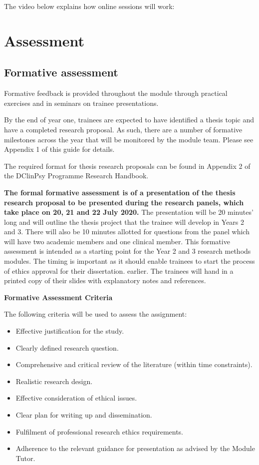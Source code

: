 \documentclass[
]{book}
\providecommand{\tightlist}{%
  \setlength{\itemsep}{0pt}\setlength{\parskip}{0pt}}
\begin{document}
The video below explains how online sessions will work:

\hypertarget{assessment}{%
\chapter{Assessment}\label{assessment}}

\hypertarget{formative-assessment}{%
\section{Formative assessment}\label{formative-assessment}}

Formative feedback is provided throughout the module through practical exercises and in seminars on trainee presentations.

By the end of year one, trainees are expected to have identified a thesis topic and have a completed research proposal. As such, there are a number of formative milestones across the year that will be monitored by the module team. Please see Appendix 1 of this guide for details.

The required format for thesis research proposals can be found in Appendix 2 of the DClinPsy
Programme Research Handbook.

\textbf{The formal formative assessment is of a presentation of the thesis research proposal to be presented during the research panels, which take place on 20, 21 and 22 July 2020.} The presentation will be 20 minutes' long and will outline the thesis project that the trainee will develop in Years 2 and 3. There will also be 10 minutes allotted for questions from the panel which will have two academic members and one clinical member. This formative assessment is intended as a starting point for the Year 2 and 3 research methods modules. The timing is important as it should enable trainees to start the process of ethics approval for their dissertation. earlier. The trainees will hand in a printed copy of their slides with explanatory notes and references.

\textbf{Formative Assessment Criteria}

The following criteria will be used to assess the assignment:

\begin{itemize}
\tightlist
\item
  Effective justification for the study.
\item
  Clearly defined research question.
\item
  Comprehensive and critical review of the literature (within time constraints).
\item
  Realistic research design.
\item
  Effective consideration of ethical issues.
\item
  Clear plan for writing up and dissemination.
\item
  Fulfilment of professional research ethics requirements.
\item
  Adherence to the relevant guidance for presentation as advised by the Module Tutor.
\end{itemize}
\end{document}
